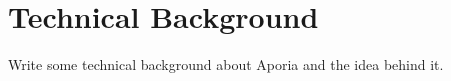 \section{Technical Background}

Write some technical background about Aporia and the idea behind it.
